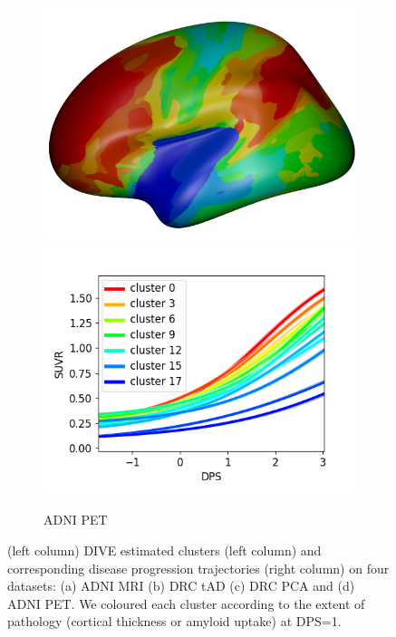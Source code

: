 \begin{figure}
  \begin{subfigure}[b]{\textwidth}
   \centering
  \includegraphics[width=\scalingFactorSubfigBrain \textwidth,trim=0 0 0 20,clip]{images/atrophyExtent24_adniPetInitk-meansCl18Pr1Ra1_VDPM_MRF.png} \includegraphics[width=\scalingFactorSubfigBrain \textwidth,trim=0 10 0 30,clip]{images/trajSamplesOneFig_adniPetInitk-meansCl18Pr1Ra1_VDPM_MRF.png}
    \caption{ADNI PET}
    \label{diveClustAdniPet}
  \end{subfigure}
  

  \caption[DIVE Results on ADNI and DRC cohorts]{(left column) DIVE estimated clusters (left column) and corresponding disease progression trajectories (right column) on four datasets: (a) ADNI MRI (b) DRC tAD (c) DRC PCA and (d) ADNI PET. We coloured each cluster according to the extent of pathology (cortical thickness or amyloid uptake) at DPS=1.}
  \label{diveClustTrajAll}
\end{figure}


